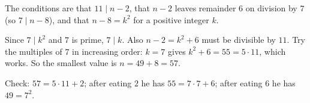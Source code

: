 The conditions are that $11\mid n-2$, that $n-2$ leaves remainder $6$ on division by $7$ (so $7\mid n-8$), and that $n-8=k^2$ for a positive integer $k$.

Since $7\mid k^2$ and $7$ is prime, $7\mid k$. Also $n-2=k^2+6$ must be divisible by $11$. Try the multiples of $7$ in increasing order: $k=7$ gives $k^2+6=55=5\cdot11$, which works. So the smallest value is $n=49+8=\boxed{57}$.

Check: $57=5\cdot11+2$; after eating $2$ he has $55=7\cdot7+6$; after eating $6$ he has $49=7^2$.
